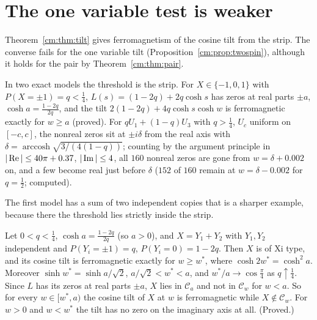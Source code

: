 \section{The one variable test is weaker}\label{cm:sec:counter}

Theorem~\ref{cm:thm:tilt} gives ferromagnetism of the cosine tilt from the strip. The converse fails for the one variable tilt (Proposition~\ref{cm:prop:twospin}), although it holds for the pair by Theorem~\ref{cm:thm:pair}.

In two exact models the threshold is the strip. For $X\in\{-1,0,1\}$ with $P(X=\pm1)=q<\frac14$, $L(s)=(1-2q)+2q\cosh s$ has zeros at real parts $\pm a$, $\cosh a=\frac{1-2q}{2q}$, and the tilt $2(1-2q)+4q\cosh s\cosh w$ is ferromagnetic exactly for $w\ge a$ (proved). For $qU_1+(1-q)U_3$ with $q>\frac14$, $U_c$ uniform on $[-c,c]$, the nonreal zeros sit at $\pm i\delta$ from the real axis with $\delta=\operatorname{arccosh}\sqrt{3/(4(1-q))}$; counting by the argument principle in $|\operatorname{Re}|\le40\pi+0.37$, $|\operatorname{Im}|\le4$, all $160$ nonreal zeros are gone from $w=\delta+0.002$ on, and a few become real just before $\delta$ ($152$ of $160$ remain at $w=\delta-0.002$ for $q=\frac12$; computed).

The first model has a sum of two independent copies that is a sharper example, because there the threshold lies strictly inside the strip.

\begin{proposition}\label{cm:prop:twospin}
Let $0<q<\frac14$, $\cosh a=\frac{1-2q}{2q}$ (so $a>0$), and $X=Y_1+Y_2$ with $Y_1,Y_2$ independent and $P(Y_i=\pm1)=q$, $P(Y_i=0)=1-2q$. Then $X$ is of Xi type, and its cosine tilt is ferromagnetic exactly for $w\ge w^*$, where $\cosh 2w^*=\cosh^2a$. Moreover $\sinh w^*=\sinh a/\sqrt2$, $a/\sqrt2<w^*<a$, and $w^*/a\to\cos\frac\pi4$ as $q\uparrow\frac14$. Since $L$ has its zeros at real parts $\pm a$, $X$ lies in $\mathcal C_a$ and not in $\mathcal C_w$ for $w<a$. So for every $w\in[w^*,a)$ the cosine tilt of $X$ at $w$ is ferromagnetic while $X\notin\mathcal C_w$. For $w>0$ and $w<w^*$ the tilt has no zero on the imaginary axis at all. (Proved.)
\end{proposition}

